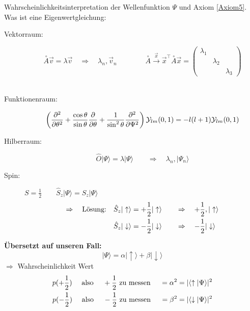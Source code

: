 Wahrscheinlichkeitsinterpretation der Wellenfunktion $ \Psi $ und Axiom \ref{Axiom5}.\\[5pt]
Was ist eine Eigenwertgleichung:\\
\begin{description}
	\item[Vektorraum:]
	$$ \overset{\circ}{A} \vec{v} = \lambda \vec{v} \quad \Rightarrow \quad \lambda_n, \vec{v}_n \qquad \qquad \overset{\circ}{A} \overset{\vec{x}}{\rightarrow} \vec{x}^\top \overset{\circ}{A} \vec{x} = \begin{pmatrix}
	\lambda_1 \\
	& \lambda_2 \\
	& & \lambda_3
	\end{pmatrix} $$
	\\[5pt]
	\item[Funktionenraum:]
	$$ \left(\frac{\partial ^2}{\partial \theta^2} + \frac{\cos \theta}{\sin \theta} \frac{\partial }{\partial \theta} + \frac{1}{\sin ^2 \theta} \frac{\partial ^2}{\partial \Psi^2} \right) \mathcal{Y}_{lm}(0,1) = - l ( l + 1 ) \mathcal{Y}_{lm}(0,1) $$
	\item[Hilberraum:]
	$$ \hat{O} | \Psi \rangle = \lambda | \Psi \rangle \qquad \Rightarrow \quad \lambda_n, | \Psi_n \rangle $$
	\item[Spin:] $ S = \frac{1}{2} \qquad \hat{S}_z |\Psi \rangle = S_z |\Psi \rangle $
	\begin{align*}
	\Rightarrow \quad \textrm{Lösung:} \quad \hat{S}_z |\uparrow \rangle &= + \frac{1}{2} | \uparrow \rangle \qquad \Rightarrow \quad + \frac{1}{2}, | \uparrow \rangle\\
	\hat{S}_z | \downarrow \rangle &= - \frac{1}{2} | \downarrow \rangle \qquad \Rightarrow \quad - \frac{1}{2} | \downarrow \rangle
	\end{align*}
\end{description}
\textbf{Übersetzt auf unseren Fall:}
\begin{equation*}
| \Psi \rangle = \alpha | \uparrow \rangle + \beta | \downarrow \rangle
\end{equation*}
$ \Rightarrow $ Wahrscheinlichkeit Wert
\begin{align*}
p(+\frac{1}{2}) \quad \textrm{ also } \quad + \frac{1}{2} \textrm{ zu messen } \quad = \alpha^2 = | \langle \uparrow | \Psi \rangle | ^2\\
p(-\frac{1}{2}) \quad \textrm{ also } \quad - \frac{1}{2} \textrm{ zu messen } \quad = \beta^2 = |\langle \downarrow | \Psi \rangle | ^2
\end{align*}
